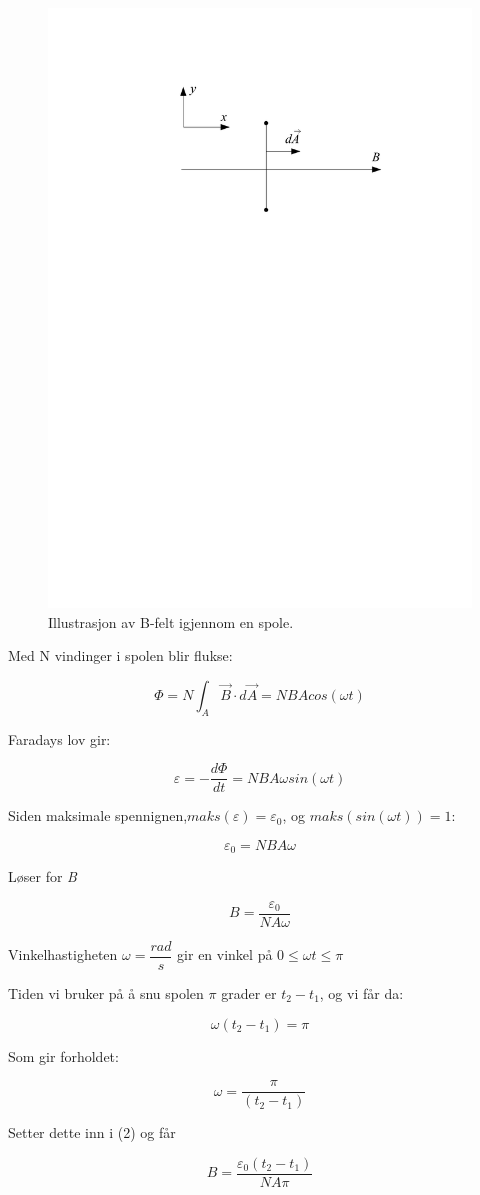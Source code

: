 \documentclass[a4paper,norsk,12pt]{article}
\begin{document}
\begin{figure}[H]
\centering
  \includegraphics[width=\linewidth, trim={1cm 19cm 1cm 4cm},clip, width=0.8\textwidth,]{illuB.pdf}
  \caption{Illustrasjon av B-felt igjennom en spole.}
  \label{fig:plot11}
\end{figure}

Med N vindinger i spolen blir flukse:

$$ \Phi = N \int_A \vec{B} \cdot d \vec{A}  = N B A cos(\omega t) $$

Faradays lov gir:

$$ \varepsilon = - \dfrac{d \Phi}{dt} = N B A \omega sin(\omega t) $$

Siden maksimale spennignen,$ maks(\varepsilon) = \varepsilon_0 $, og $ maks(sin(\omega t)) = 1 $: 

$$ \varepsilon_0 = N B A  \omega $$

Løser for \textit{B}

\begin{equation}
B = \dfrac{\varepsilon_0}{N A \omega} 
\end{equation}

Vinkelhastigheten $\omega=\dfrac{rad}{s} $ gir en vinkel på $ 0 \leq \omega t \leq \pi $

Tiden vi bruker på å snu spolen $\pi$ grader er $t_2 - t_1$, og vi får da:

$$ \omega (t_2 - t_1) = \pi $$

Som gir forholdet:

$$ \omega = \dfrac{\pi}{(t_2 - t_1)} $$

Setter dette inn i (2) og får

$$ B = \dfrac{\varepsilon_0 (t_2 - t_1)}{N A \pi} $$ 
\end{document}
